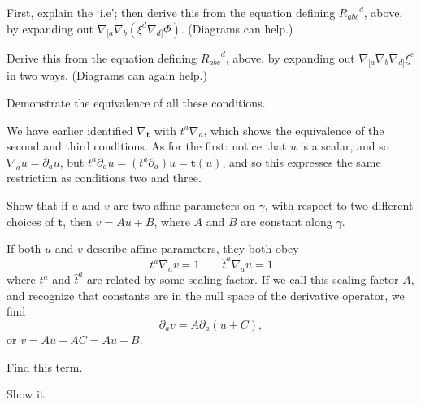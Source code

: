 \documentclass[../the-road-to-reality.tex]{subfiles}
\begin{document}
\begin{questions}
\question First, explain the `i.e'; then derive this from the equation defining ${R_{abc}}^d$, above, by expanding out $\nabla_{[a}\nabla_{b}(\xi^d\nabla_{d]}\Phi)$. (Diagrams can help.)

\question Derive this from the equation defining ${R_{abc}}^d$, above, by expanding out $\nabla_{[a}\nabla_b\nabla_{d]}\xi^e$ in two ways. (Diagrams can again help.)

\question Demonstrate the equivalence of all these conditions.

  \begin{solution}
    We have earlier identified $\nabla_{\mathbf{t}}$ with $t^a\nabla_a$, which
    shows the equivalence of the second and third conditions. As for the first:
    notice that $u$ is a scalar, and so $\nabla_a{u} = \partial_au$, but
    $t^a\partial_au = (t^a\partial_a)u = \mathbf{t}(u)$, and so this expresses
    the same restriction as conditions two and three.
  \end{solution}

\question Show that if $u$ and $v$ are two affine parameters on $\gamma$, with
  respect to two different choices of $\mathbf{t}$, then $v = Au + B$, where $A$
  and $B$ are constant along $\gamma$.

  \begin{solution}
    If both $u$ and $v$ describe affine parameters, they both obey
    \[
      t^a\nabla_av = 1 \qquad \hat{t}^a\nabla_au = 1
    \]
    where $t^a$ and $\hat{t}^a$ are related by some scaling factor. If we call
    this scaling factor $A$, and recognize that constants are in the null space
    of the derivative operator, we find
    \[
      \partial_av = A\partial_a(u + C),
    \]
    or $v = Au + AC = Au + B$.
  \end{solution}

\question Find this term.

\question Show it.


\end{questions}
\end{document}
